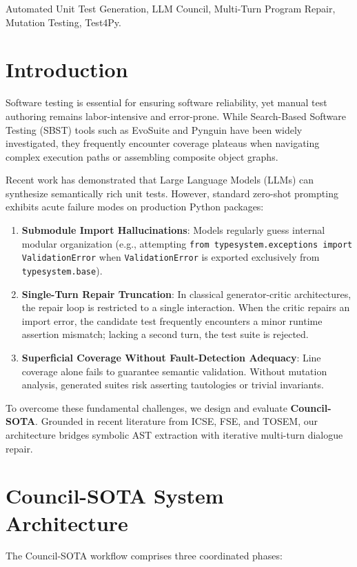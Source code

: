 \documentclass[conference]{IEEEtran}
\begin{document}
\begin{IEEEkeywords}
Automated Unit Test Generation, LLM Council, Multi-Turn Program Repair, Mutation Testing, Test4Py.
\end{IEEEkeywords}

\section{Introduction}
Software testing is essential for ensuring software reliability, yet manual test authoring remains labor-intensive and error-prone. While Search-Based Software Testing (SBST) tools such as EvoSuite and Pynguin have been widely investigated, they frequently encounter coverage plateaus when navigating complex execution paths or assembling composite object graphs.

Recent work has demonstrated that Large Language Models (LLMs) can synthesize semantically rich unit tests. However, standard zero-shot prompting exhibits acute failure modes on production Python packages:
\begin{enumerate}
    \item \textbf{Submodule Import Hallucinations}: Models regularly guess internal modular organization (e.g., attempting \texttt{from typesystem.exceptions import ValidationError} when \texttt{ValidationError} is exported exclusively from \texttt{typesystem.base}).
    \item \textbf{Single-Turn Repair Truncation}: In classical generator-critic architectures, the repair loop is restricted to a single interaction. When the critic repairs an import error, the candidate test frequently encounters a minor runtime assertion mismatch; lacking a second turn, the test suite is rejected.
    \item \textbf{Superficial Coverage Without Fault-Detection Adequacy}: Line coverage alone fails to guarantee semantic validation. Without mutation analysis, generated suites risk asserting tautologies or trivial invariants.
\end{enumerate}

To overcome these fundamental challenges, we design and evaluate \textbf{Council-SOTA}. Grounded in recent literature from ICSE, FSE, and TOSEM, our architecture bridges symbolic AST extraction with iterative multi-turn dialogue repair.

\section{Council-SOTA System Architecture}
The Council-SOTA workflow comprises three coordinated phases:
\end{document}
